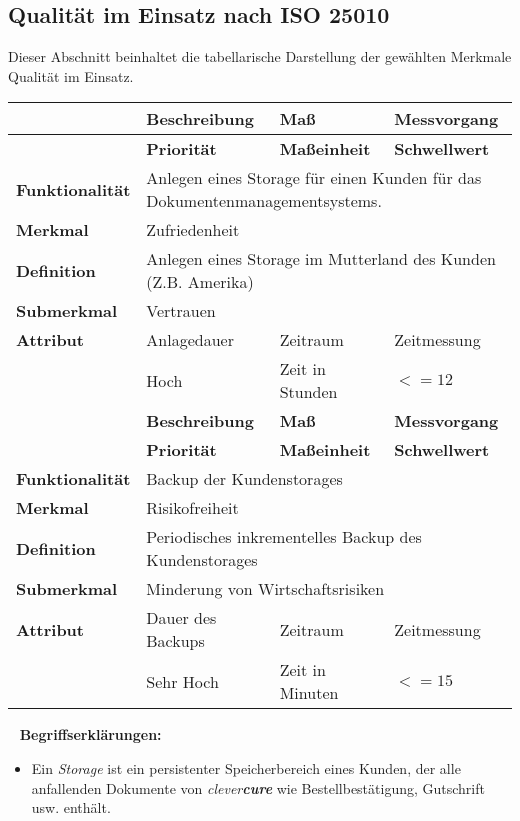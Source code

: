 \subsection{Qualität im Einsatz nach ISO 25010}
\label{sec:qualtity-quality-in-use}
Dieser Abschnitt beinhaltet die tabellarische Darstellung der gewählten Merkmale Qualität im Einsatz.
\newline
\newline
\bgroup
\def\arraystretch{1.5}%
\begin{tabularx}{\textwidth}{ p{70pt} | X | X | X }
	\hline
	& \textbf{Beschreibung} & \textbf{Maß} & \textbf{Messvorgang} \\ \hline
	& \textbf{Priorität} & \textbf{Maßeinheit} & \textbf{Schwellwert} \\ \hline
	\textbf{Funktionalität} & \multicolumn{3}{p{300pt}}{Anlegen eines Storage für einen Kunden für das Dokumentenmanagementsystems.} \\ \hline
	\textbf{Merkmal} & \multicolumn{3}{X}{Zufriedenheit} \\ \hline
	\textbf{Definition} & \multicolumn{3}{p{380pt}}{Anlegen eines Storage im Mutterland des Kunden (Z.B. Amerika)} \\ \hline
	\textbf{Submerkmal} & \multicolumn{3}{X}{Vertrauen} \\ \hline 
	\textbf{Attribut} & Anlagedauer & Zeitraum & Zeitmessung \\ \hline
	& Hoch               & Zeit in Stunden & $<= 12$  \\ 
	\hline 
	\hline 
	& \textbf{Beschreibung} & \textbf{Maß} & \textbf{Messvorgang} \\ \hline
	& \textbf{Priorität} & \textbf{Maßeinheit} & \textbf{Schwellwert} \\ \hline
	\textbf{Funktionalität} & \multicolumn{3}{p{300pt}}{Backup der Kundenstorages} \\ \hline
	\textbf{Merkmal} & \multicolumn{3}{X}{Risikofreiheit} \\ \hline
	\textbf{Definition} & \multicolumn{3}{p{380pt}}{Periodisches inkrementelles Backup des Kundenstorages} \\ \hline
	\textbf{Submerkmal} & \multicolumn{3}{X}{Minderung von Wirtschaftsrisiken} \\ \hline 
	\textbf{Attribut} & Dauer des Backups  & Zeitraum  & Zeitmessung  \\ \hline
	& Sehr Hoch               & Zeit in Minuten & $<= 15$  \\ \hline
\end{tabularx}
\egroup
\ \newline 
\newline
\textbf{Begriffserklärungen:}
\begin{itemize}
	\item Ein \emph{Storage} ist ein persistenter Speicherbereich eines Kunden, der alle anfallenden Dokumente von \emph{clever\textbf{cure}} wie Bestellbestätigung, Gutschrift usw. enthält.
\end{itemize}
\ \newpage
